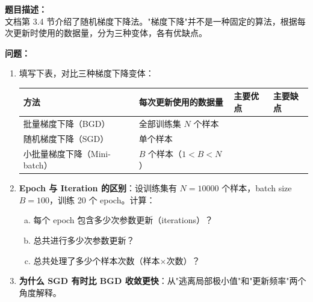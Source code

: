 \documentclass[a4paper,11pt]{ctexart}
\begin{document}
\begin{problembox}
    \textbf{题目描述：}\\
    文档第 3.4 节介绍了随机梯度下降法。"梯度下降"并不是一种固定的算法，根据每次更新时使用的数据量，分为三种变体，各有优缺点。

    \vspace{0.3cm}
    \textbf{问题：}
    \begin{enumerate}[(1)]
        \item 填写下表，对比三种梯度下降变体：

        \begin{center}
        \begin{tabular}{p{2.5cm} p{3.0cm} p{3.0cm} p{3.2cm}}
            \toprule
            方法 & 每次更新使用的数据量 & 主要优点 & 主要缺点 \\
            \midrule
            批量梯度下降（BGD） & 全部训练集 $N$ 个样本 & \underline{\hspace{2.5cm}} & \underline{\hspace{2.5cm}} \\[1.5em]
            随机梯度下降（SGD） & 单个样本 & \underline{\hspace{2.5cm}} & \underline{\hspace{2.5cm}} \\[1.5em]
            小批量梯度下降（Mini-batch） & $B$ 个样本（$1 < B < N$） & \underline{\hspace{2.5cm}} & \underline{\hspace{2.5cm}} \\
            \bottomrule
        \end{tabular}
        \end{center}

        \item \textbf{Epoch 与 Iteration 的区别}：设训练集有 $N=10000$ 个样本，batch size $B=100$，训练 20 个 epoch。计算：
        \begin{enumerate}[a.]
            \item 每个 epoch 包含多少次参数更新（iterations）？
            \item 总共进行多少次参数更新？
            \item 总共处理了多少个样本次数（样本$\times$次数）？
        \end{enumerate}

        \item \textbf{为什么 SGD 有时比 BGD 收敛更快}：从"逃离局部极小值"和"更新频率"两个角度解释。


\end{enumerate}
\end{problembox}
\end{document}
